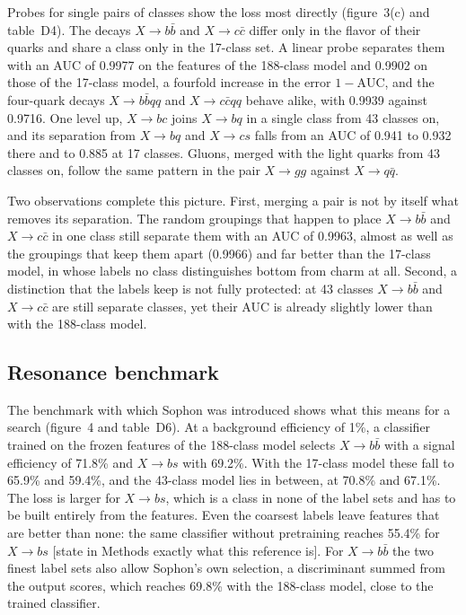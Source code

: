 \documentclass[11pt,a4paper]{article}
\newcommand{\bn}[1]{\textcolor{blue!70!black}{#1}}
\newcommand{\chk}[1]{\textcolor{red!70!black}{#1}}
\newcommand{\bb}{b\bar{b}}
\newcommand{\cc}{c\bar{c}}
\newcommand{\qq}{q\bar{q}}
\begin{document}
Probes for single pairs of classes show the loss most directly (figure~3(c) and table~D4).
The decays $X\to\bb$ and $X\to\cc$ differ only in the flavor of their quarks and share a class
only in the 17-class set.
A linear probe separates them with an AUC of \bn{0.9977} on the features of the 188-class model
and \bn{0.9902} on those of the 17-class model, a fourfold increase in the error $1-\mathrm{AUC}$,
and the four-quark decays $X\to\bb qq$ and $X\to\cc qq$ behave alike, with \bn{0.9939} against
\bn{0.9716}.
One level up, $X\to bc$ joins $X\to bq$ in a single class from 43 classes on, and its separation
from $X\to bq$ and $X\to cs$ falls from an AUC of \bn{0.941} to \bn{0.932} there and to
\bn{0.885} at 17 classes.
Gluons, merged with the light quarks from 43 classes on, follow the same pattern in the pair
$X\to gg$ against $X\to\qq$.

Two observations complete this picture.
First, merging a pair is not by itself what removes its separation.
The random groupings that happen to place $X\to\bb$ and $X\to\cc$ in one class still separate
them with an AUC of \bn{0.9963}, almost as well as the groupings that keep them apart
(\bn{0.9966}) and far better than the 17-class model, in whose labels no class distinguishes
bottom from charm at all.
Second, a distinction that the labels keep is not fully protected: at 43 classes $X\to\bb$ and
$X\to\cc$ are still separate classes, yet their AUC is already slightly lower than with the
188-class model.

\subsection{Resonance benchmark}

The benchmark with which Sophon was introduced shows what this means for a search (figure~4 and
table~D6).
At a background efficiency of 1\%, a classifier trained on the frozen features of the 188-class
model selects $X\to\bb$ with a signal efficiency of \bn{71.8\%} and $X\to bs$ with \bn{69.2\%}.
With the 17-class model these fall to \bn{65.9\%} and \bn{59.4\%}, and the 43-class model lies in
between, at \bn{70.8\%} and \bn{67.1\%}.
The loss is larger for $X\to bs$, which is a class in none of the label sets and has to be built
entirely from the features.
Even the coarsest labels leave features that are better than none:
\chk{the same classifier without pretraining reaches \bn{55.4\%} for $X\to bs$ [state in Methods
exactly what this reference is]}.
For $X\to\bb$ the two finest label sets also allow Sophon's own selection, a discriminant summed
from the output scores, which reaches \bn{69.8\%} with the 188-class model, close to the trained
classifier.
\end{document}
